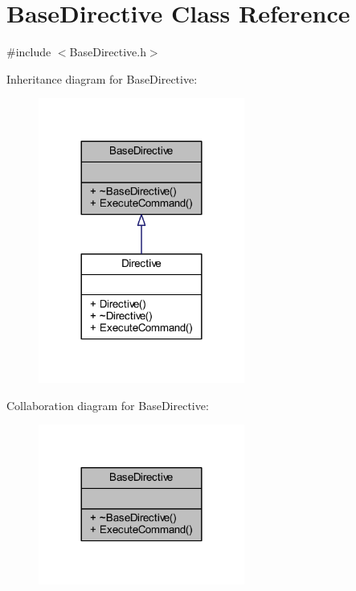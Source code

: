 \hypertarget{class_base_directive}{}\section{Base\+Directive Class Reference}
\label{class_base_directive}


{\ttfamily \#include $<$Base\+Directive.\+h$>$}



Inheritance diagram for Base\+Directive\+:
\nopagebreak
\begin{figure}[H]
\begin{center}
\leavevmode
\includegraphics[width=192pt]{class_base_directive__inherit__graph}
\end{center}
\end{figure}


Collaboration diagram for Base\+Directive\+:
\nopagebreak
\begin{figure}[H]
\begin{center}
\leavevmode
\includegraphics[width=192pt]{class_base_directive__coll__graph}
\end{center}
\end{figure}
